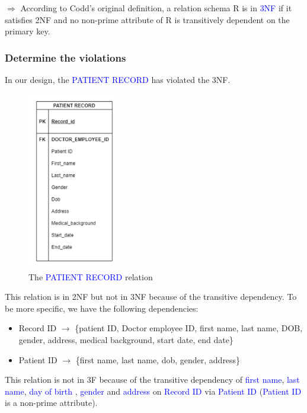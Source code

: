 \documentclass[a4paper]{article}
\numberwithin{equation}{section}
\begin{document}
\(\Rightarrow \) According to Codd’s original definition, a relation schema R is in
\textcolor{blue}{3NF} if it satisfies 2NF and no non-prime attribute of R is transitively dependent on the primary key.

\subsubsection{Determine the violations}
In our design, the \textcolor{blue}{PATIENT RECORD} has violated the 3NF\@.
\begin{figure}[H]
  \centering
  \includegraphics[width = 4cm ]{assets/3NFviolation.PNG}
  \caption{The \textcolor{blue}{PATIENT RECORD} relation}
\end{figure}

This relation is in 2NF but not in 3NF because of the transitive
dependency.
To be more specific, we have the following dependencies:
\begin{itemize}
  \item Record ID \(\rightarrow \) \{patient ID, Doctor employee ID, first name, last name, DOB, gender, address, medical background, start date, end date\}
  \item Patient ID \(\rightarrow \) \{first name, last name, dob, gender, address\}
\end{itemize}

This relation is not in 3F because of the transitive dependency of \textcolor{blue}{first name}, \textcolor{blue}{last name}, \textcolor{blue}{day of birth }, \textcolor{blue}{gender} and \textcolor{blue}{address} on \textcolor{blue}{Record ID} via \textcolor{blue}{Patient ID} (\textcolor{blue}{Patient ID} is a non-prime attribute).
\end{document}
